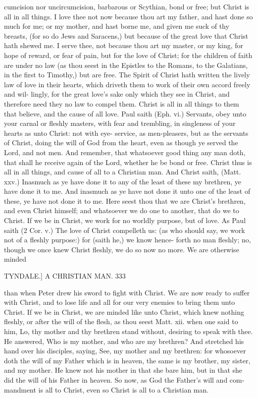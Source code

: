 \documentclass{custom}
\begin{document}
{cumcision nor uncircumcision, barbarous or Scythian, bond 
or free; but Christ is all in all things. I love thee not 
now because thou art my father, and hast done so much 
for me; or my mother, and hast borne me, and given me
suck of thy breasts, (for so do Jews and Saracens,) but 
because of the great love that Christ hath shewed me. I 
serve thee, not because thou art my master, or my king, 
for hope of reward, or fear of pain, but for the love of 
Christ; for the children of faith are under no law (as 
thou seest in the Epistles to the Romans, to the Galatians, 
in the first to Timothy,) but are free. The Spirit of Christ 
hath written the lively law of love in their hearts, which 
driveth them to work of their own accord freely and wil- 
lingly, for the great love's sake only which they see in 
Christ, and therefore need they no law to compel them. 
Christ is all in all things to them that believe, and the cause 
of all love. Paul saith (Eph. vi.) Servants, obey unto 
your carnal or fleshly masters, with fear and trembling, in 
singleness of your hearts as unto Christ: not with eye- 
service, as men-pleasers, but as the servants of Christ, 
doing the will of God from the heart, even as though ye 
served the Lord, and not men. And remember, that 
whatsoever good thing any man doth, that shall he receive 
again of the Lord, whether he be bond or free. Christ 
thus is all in all things, and cause of all to a Christian man. 
And Christ saith, (Matt. xxv.) Inasmuch as ye have done 
it to any of the least of these my brethren, ye have done 
it to me. And inasmuch as ye have not done it unto one 
of the least of these, ye have not done it to me. Here 
seest thou that we are Christ's brethren, and even Christ 
himself; and whatsoever we do one to another, that do we 
to Christ. If we be in Christ, we work for no worldly 
purpose, but of love. As Paul saith (2 Cor. v.) The love 
of Christ compelleth us: (as who should say, we work 
not of a fleshly purpose:) for (saith he,) we know hence- 
forth no man fleshly; no, though we once knew Christ 
fleshly, we do so now no more. We are otherwise minded 


TYNDALE.]
A CHRISTIAN MAN.
333 

than when Peter drew his sword to fight with Christ. We 
are now ready to suffer with Christ, and to lose life and 
all for our very enemies to bring them unto Christ. If we 
be in Christ, we are minded like unto Christ, which knew 
nothing fleshly, or after the will of the flesh, as thou seest 
Matt. xii. when one said to him, Lo, thy mother and thy 
brethren stand without, desiring to speak with thee. He 
answered, Who is my mother, and who are my brethren? 
And stretched his hand over his disciples, saying, See, my 
mother and my brethren: for whosoever doth the will of 
my Father which is in heaven, the same is my brother, my 
sister, and my mother. He knew not his mother in that 
she bare him, but in that she did the will of his Father in 
heaven. So now, as God the Father's will and com- 
mandment is all to Christ, even so Christ is all to a 
Christian man. 

}
\end{document}
